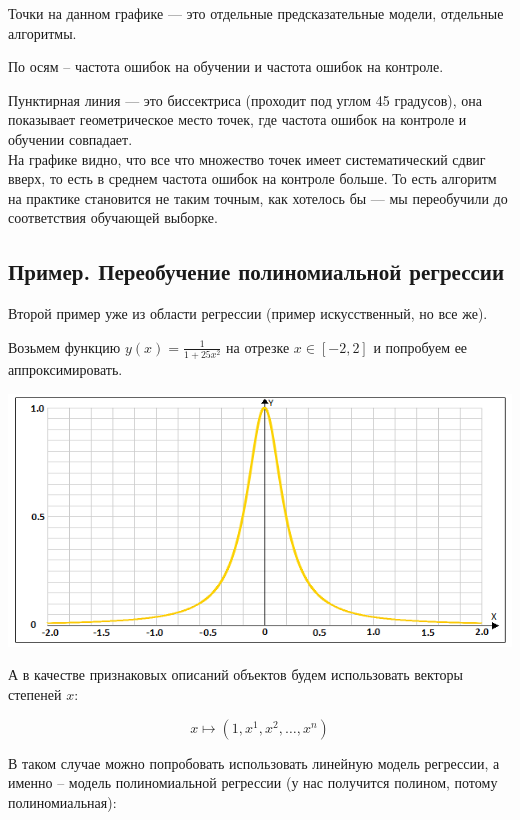 \documentclass{article}
\begin{document}
Точки на данном графике --- это отдельные предсказательные модели, отдельные алгоритмы.

По осям -- частота ошибок на обучении и частота ошибок на контроле.

Пунктирная линия --- это биссектриса (проходит под углом 45 градусов), она показывает геометрическое место точек, где частота ошибок на контроле и обучении совпадает.
\\

На графике видно, что все что множество точек имеет систематический сдвиг вверх, то есть в среднем частота ошибок на контроле больше. То есть алгоритм на практике становится не таким точным, как хотелось бы --- мы переобучили до соответствия обучающей выборке.
\\

\newpage
\subsection{Пример. Переобучение полиномиальной регрессии}

Второй пример уже из области регрессии (пример искусственный, но все же).

Возьмем функцию $y(x) = \frac{1}{1 + 25 x^2}$ на отрезке $x \in [-2, 2]$ и попробуем ее аппроксимировать.

\begin{center}
    \includegraphics[scale=0.8]{images/2_2.png}
\end{center}

А в качестве признаковых описаний объектов будем использовать векторы степеней $x$:

$$x \mapsto (1, x^1, x^2, \ldots, x^n)$$

В таком случае можно попробовать использовать линейную модель регрессии, а именно -- модель полиномиальной регрессии (у нас получится полином, потому полиномиальная):
\end{document}

